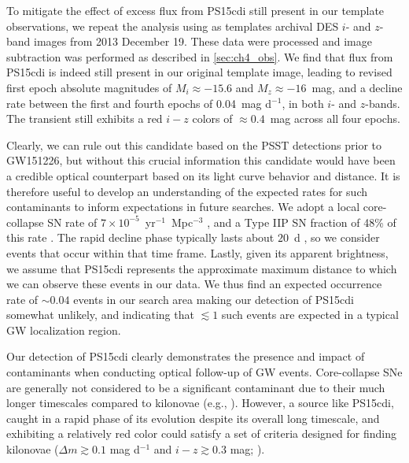 To mitigate the effect of excess flux from PS15cdi still present in our template observations, we repeat the analysis  using as templates archival DES $i$- and $z$-band images from 2013 December 19. These data were processed  and image subtraction was performed as described in \cref{sec:ch4_obs}. We find that flux from PS15cdi is indeed still present  in our original template image, leading to revised first epoch absolute magnitudes of $M_i \approx -15.6$ and  $M_z \approx -16$~mag, and a decline rate between the first and fourth epochs of 0.04~mag d$^{-1}$, in both  $i$- and $z$-bands. The transient still exhibits a red $i-z$ colors of $\approx 0.4$~mag across all four epochs.

\clearpage
Clearly, we can rule out this candidate based on the PSST detections prior to  GW151226, but without this crucial information this candidate would have been a credible optical counterpart based on its light curve behavior and distance.  It is therefore useful to develop an understanding of the expected rates for such contaminants to inform expectations in future searches. We adopt a local core-collapse SN rate of   $7\times10^{-5}$~yr$^{-1}$~Mpc$^{-3}$ \citep{Li+11,Cappellaro+15},  and a Type IIP SN fraction of 48\% of this rate \citep{Smith+11}. The rapid decline phase typically lasts about $20$~d \citep{KasenWoosley09,Sanders+15,Dhungana+16},  so we consider events that occur within that time frame. Lastly, given its apparent brightness,  we assume that PS15cdi represents the approximate maximum distance to which we can observe these events in our data. We thus find an expected occurrence rate of $\sim 0.04$ events in our search area making our detection of PS15cdi somewhat unlikely, and indicating that $\lesssim 1$ such  events are expected in a typical GW localization region.

Our detection of PS15cdi clearly demonstrates the presence and impact of contaminants when conducting optical follow-up of GW events. Core-collapse SNe are generally not considered to be a significant contaminant due to their much longer timescales compared to kilonovae (e.g., \citealt{CowpBerger15}). However, a source like PS15cdi, caught in a rapid phase of its evolution  despite its overall long timescale, and exhibiting a relatively red color could satisfy a set of criteria designed for finding kilonovae ($\Delta m\gtrsim 0.1$ mag d$^{-1}$ and $i-z\gtrsim 0.3$ mag; \citealt{CowpBerger15}).

